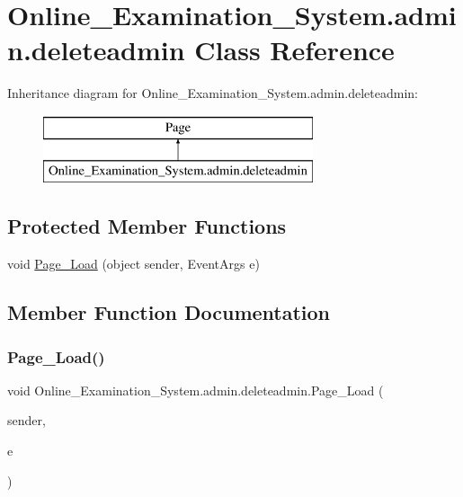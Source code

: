 \hypertarget{class_online___examination___system_1_1admin_1_1deleteadmin}{}\section{Online\+\_\+\+Examination\+\_\+\+System.\+admin.\+deleteadmin Class Reference}
\label{class_online___examination___system_1_1admin_1_1deleteadmin}
Inheritance diagram for Online\+\_\+\+Examination\+\_\+\+System.\+admin.\+deleteadmin\+:\begin{figure}[H]
\begin{center}
\leavevmode
\includegraphics[height=2.000000cm]{class_online___examination___system_1_1admin_1_1deleteadmin}
\end{center}
\end{figure}
\subsection*{Protected Member Functions}
\begin{DoxyCompactItemize}
\item 
void \mbox{\hyperlink{class_online___examination___system_1_1admin_1_1deleteadmin_aef60248e0f03c1c8c804cc7499fef17c}{Page\+\_\+\+Load}} (object sender, Event\+Args e)
\end{DoxyCompactItemize}


\subsection{Member Function Documentation}
\mbox{\label{class_online___examination___system_1_1admin_1_1deleteadmin_aef60248e0f03c1c8c804cc7499fef17c}} 
\subsubsection{\texorpdfstring{Page\_Load()}{Page\_Load()}}
{\footnotesize\ttfamily void Online\+\_\+\+Examination\+\_\+\+System.\+admin.\+deleteadmin.\+Page\+\_\+\+Load (\begin{DoxyParamCaption}\item[{object}]{sender,  }\item[{Event\+Args}]{e }\end{DoxyParamCaption})\hspace{0.3cm}{\ttfamily [protected]}}



